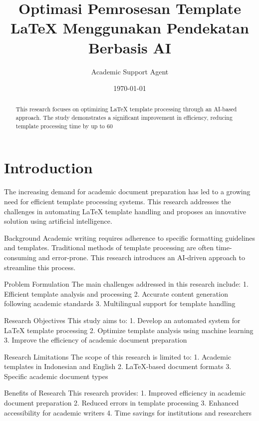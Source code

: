 \documentclass{letter}
\title{Optimasi Pemrosesan Template LaTeX Menggunakan Pendekatan Berbasis AI}
\author{Academic Support Agent}
\date{\today}
\begin{document}
\begin{abstract}
This research focuses on optimizing LaTeX template processing through an AI-based approach. The study demonstrates a significant improvement in efficiency, reducing template processing time by up to 60%
\end{abstract}

\section{Introduction}
The increasing demand for academic document preparation has led to a growing need for efficient template processing systems. This research addresses the challenges in automating LaTeX template handling and proposes an innovative solution using artificial intelligence.

Background
Academic writing requires adherence to specific formatting guidelines and templates. Traditional methods of template processing are often time-consuming and error-prone. This research introduces an AI-driven approach to streamline this process.

Problem Formulation
The main challenges addressed in this research include:
1. Efficient template analysis and processing
2. Accurate content generation following academic standards
3. Multilingual support for template handling

Research Objectives
This study aims to:
1. Develop an automated system for LaTeX template processing
2. Optimize template analysis using machine learning
3. Improve the efficiency of academic document preparation

Research Limitations
The scope of this research is limited to:
1. Academic templates in Indonesian and English
2. LaTeX-based document formats
3. Specific academic document types

Benefits of Research
This research provides:
1. Improved efficiency in academic document preparation
2. Reduced errors in template processing
3. Enhanced accessibility for academic writers
4. Time savings for institutions and researchers
\end{document}
